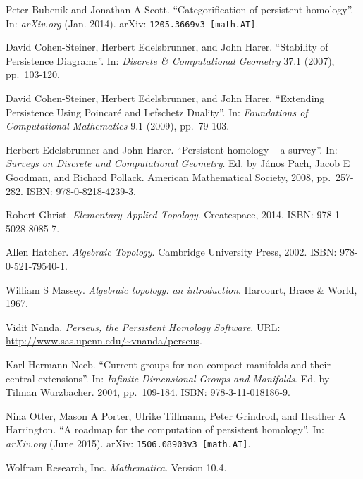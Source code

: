\documentclass[12pt]{article}
\numberwithin{equation}{subsection}
\numberwithin{theorem}{subsection}
\numberwithin{lemma}{subsection}
\numberwithin{corollary}{subsection}
\numberwithin{definition}{subsection}
\numberwithin{example}{subsection}
\numberwithin{note}{subsection}
\begin{document}
    \begin{thebibliography}{99}

            Peter Bubenik and Jonathan A Scott.
            ``Categorification of persistent homology''.
            In: \emph{arXiv.org} (Jan. 2014).
            arXiv: \texttt{1205.3669v3 [math.AT]}.

            David Cohen-Steiner, Herbert Edelsbrunner, and John Harer.
            ``Stability of Persistence Diagrams''.
            In: \emph{Discrete \& Computational Geometry} 37.1 (2007), pp.~103-120.

            David Cohen-Steiner, Herbert Edelsbrunner, and John Harer.
            ``Extending Persistence Using Poincaré and Lefschetz Duality''.
            In: \emph{Foundations of Computational Mathematics} 9.1 (2009), pp.~79-103.

            Herbert Edelsbrunner and John Harer.
            ``Persistent homology – a survey''.
            In: \emph{Surveys on Discrete and Computational Geometry}.
            Ed. by János Pach, Jacob E Goodman, and Richard Pollack.
            American Mathematical Society, 2008, pp.~257-282.
            {\sc ISBN:} 978-0-8218-4239-3.

            Robert Ghrist.
            \emph{Elementary Applied Topology}.
            Createspace, 2014.
            {\sc ISBN:} 978-1-5028-8085-7.

            Allen Hatcher.
            \emph{Algebraic Topology}.
            Cambridge University Press, 2002.
            {\sc ISBN:} 978-0-521-79540-1.

            William S Massey.
            \emph{Algebraic topology: an introduction}.
            Harcourt, Brace \& World, 1967.

            Vidit Nanda.
            \emph{Perseus, the Persistent Homology Software}.
            {\sc URL:} \url{http://www.sas.upenn.edu/~vnanda/perseus}.

            Karl-Hermann Neeb.
            ``Current groups for non-compact manifolds and their central extensions''.
            In: \emph{Infinite Dimensional Groups and Manifolds}.
            Ed. by Tilman Wurzbacher.
            2004, pp.~109-184.
            {\sc ISBN:} 978-3-11-018186-9.

            Nina Otter, Mason A Porter, Ulrike Tillmann, Peter Grindrod, and Heather A Harrington.
            ``A roadmap for the computation of persistent homology''.
            In: \emph{arXiv.org} (June 2015).
            arXiv: \texttt{1506.08903v3 [math.AT]}.

            Wolfram Research, Inc.
            \emph{Mathematica}.
            Version 10.4.

    \end{thebibliography}
\end{document}
